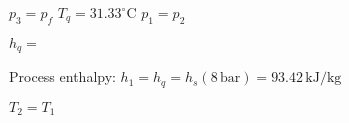 \( p_3 = p_f \)  
\( T_q = 31.33^\circ \text{C} \)  
\( p_1 = p_2 \)  

\( h_q = \)  

Process enthalpy:  
\( h_1 = h_q = h_s(8 \, \text{bar}) = 93.42 \, \text{kJ/kg} \)  

\( T_2 = T_1 \)
